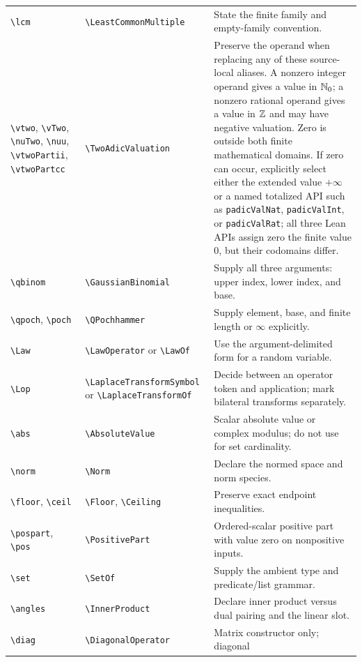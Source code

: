 \documentclass[11pt,oneside]{article}
\theoremstyle{definition}
\theoremstyle{remark}
\newcommand{\lean}[1]{%
  \ifmmode\text{\nolinkurl{#1}}\else\mbox{\nolinkurl{#1}}\fi}
\DeclareRobustCommand{\commandname}[1]{\texttt{\textbackslash#1}}
\begin{document}
\begin{longtable}{@{}p{}p{}p{}@{}}
\commandname{lcm} & \commandname{LeastCommonMultiple} & State the finite family and
empty-family convention.\\
\commandname{vtwo}, \commandname{vTwo}, \commandname{nuTwo},
\commandname{nuu}, \commandname{vtwoPartii}, \commandname{vtwoPartcc} &
\commandname{TwoAdicValuation} & Preserve the operand when replacing any of these
source-local aliases.  A nonzero integer operand gives a value in
$\mathbb{N}_{0}$; a nonzero rational operand gives a value in $\mathbb{Z}$ and may
have negative valuation.  Zero is outside both finite mathematical domains.  If zero can
occur, explicitly select either the extended value $+\infty$ or a named totalized API such
as \lean{padicValNat}, \lean{padicValInt}, or \lean{padicValRat}; all three Lean APIs
assign zero the finite value \(0\), but their codomains differ.\\
\commandname{qbinom} & \commandname{GaussianBinomial} & Supply all three arguments:
upper index, lower index, and base.\\
\commandname{qpoch}, \commandname{poch} & \commandname{QPochhammer} & Supply element,
base, and finite length or $\infty$ explicitly.\\
\commandname{Law} & \commandname{LawOperator} or \commandname{LawOf} & Use the
argument-delimited form for a random variable.\\
\commandname{Lop} & \commandname{LaplaceTransformSymbol} or
\commandname{LaplaceTransformOf} & Decide between an operator token and application; mark
bilateral transforms separately.\\
\commandname{abs} & \commandname{AbsoluteValue} & Scalar absolute value or complex
modulus; do not use for set cardinality.\\
\commandname{norm} & \commandname{Norm} & Declare the normed space and norm species.\\
\commandname{floor}, \commandname{ceil} & \commandname{Floor},
\commandname{Ceiling} & Preserve exact endpoint inequalities.\\
\commandname{pospart}, \commandname{pos} & \commandname{PositivePart} & Ordered-scalar positive part with
value zero on nonpositive inputs.\\
\commandname{set} & \commandname{SetOf} & Supply the ambient type and predicate/list
grammar.\\
\commandname{angles} & \commandname{InnerProduct} & Declare inner product versus dual
pairing and the linear slot.\\
\commandname{diag} & \commandname{DiagonalOperator} & Matrix constructor only; diagonal

\end{longtable}
\end{document}
